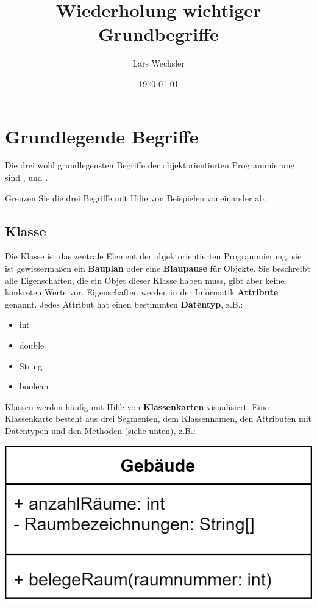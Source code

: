 \documentclass{article}
\author{Lars Wechsler}
\title{Wiederholung wichtiger Grundbegriffe}
\date{\today}
\begin{document}
\maketitle

\section{Grundlegende Begriffe}

Die drei wohl grundlegensten Begriffe der objektorientierten Programmierung sind ,  und .
\begin{task}{1}
Grenzen Sie die drei Begriffe mit Hilfe von Beispielen voneinander ab. 
\end{task}



\subsection{Klasse}
Die Klasse ist das zentrale Element der objektorientierten Programmierung, sie ist gewissermaßen ein \textbf{Bauplan} oder eine \textbf{Blaupause} für Objekte. Sie beschreibt alle Eigenschaften, die ein Objet dieser Klasse haben muss, gibt aber keine konkreten Werte vor. Eigenschaften werden in der Informatik \textbf{Attribute} genannt. Jedes Attribut hat einen bestimmten \textbf{Datentyp}, z.B.:
\begin{itemize}
    \item int
    \item double
    \item String
    \item boolean
\end{itemize}
Klassen werden häufig mit Hilfe von \textbf{Klassenkarten} visualisiert. Eine Klassenkarte besteht aus drei Segmenten, dem Klassennamen, den Attributen mit Datentypen und den Methoden (siehe unten), z.B.:
\begin{center}
    \includegraphics[scale=0.2]{../media/class.png}
\end{center}
\end{document}
